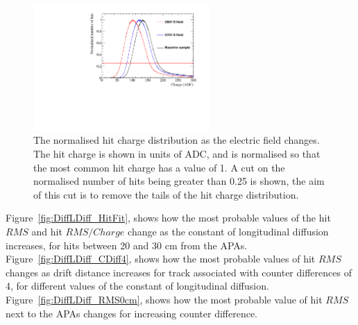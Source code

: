 \begin{figure}[h!]
  \centering
  \includegraphics[width=0.6\textwidth]{Canvas_ChargeCut_ElecField}
  \caption[The normalised hit charge distribution as the electric field changes]
          {The normalised hit charge distribution as the electric field changes. The hit charge is shown in units of ADC, and is normalised so that the most common hit charge has a value of 1. A cut on the normalised number of hits being greater than 0.25 is shown, the aim of this cut is to remove the tails of the hit charge distribution.}
  \label{fig:DiffElecStudy_ChargeCut}
\end{figure}

Figure~\ref{fig:DiffLDiff_HitFit}, shows how the most probable values of the hit $RMS$ and hit $RMS/Charge$ change as the constant of longitudinal diffusion increases, for hits between 20 and 30 cm from the APAs. Figure~\ref{fig:DiffLDiff_CDiff4}, shows how the most probable values of hit $RMS$ changes as drift distance increases for track associated with counter differences of 4, for different values of the constant of longitudinal diffusion. Figure~\ref{fig:DiffLDiff_RMS0cm}, shows how the most probable value of hit $RMS$ next to the APAs changes for increasing counter difference. \\ 

